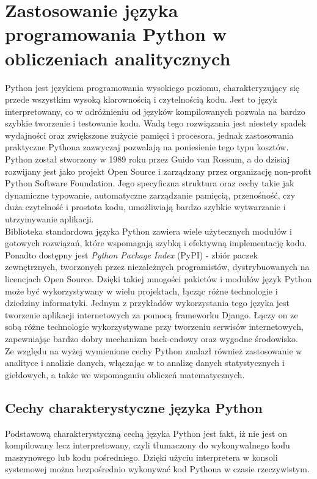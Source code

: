 
\chapter{Zastosowanie języka programowania Python w obliczeniach analitycznych}
Python jest językiem programowania wysokiego poziomu, charakteryzujący się przede wszystkim wysoką klarownością i czytelnością kodu.
Jest to język interpretowany, co w odróżnieniu od języków kompilowanych pozwala na bardzo szybkie tworzenie i testowanie kodu.
Wadą tego rozwiązania jest niestety spadek wydajności oraz zwiększone zużycie pamięci i procesora, jednak zastosowania praktyczne Pythona zazwyczaj pozwalają na poniesienie tego typu kosztów.\\

Python został stworzony w 1989 roku przez Guido van Rossum, a do dzisiaj rozwijany jest jako projekt Open Source i zarządzany przez organizację non-profit Python Software Foundation.
Jego specyficzna struktura oraz cechy takie jak dynamiczne typowanie, automatyczne zarządzanie pamięcią, przenośność, czy duża czytelność i prostota kodu, 
umożliwiają bardzo szybkie wytwarzanie i utrzymywanie aplikacji.\\

Biblioteka standardowa języka Python zawiera wiele użytecznych modułów i gotowych rozwiązań, które wspomagają szybką i efektywną implementację kodu.
Ponadto dostępny jest \textit{Python Package Index} (PyPI) - zbiór paczek zewnętrznych, tworzonych przez niezależnych programistów, dystrybuowanych na licencjach Open Source.
Dzięki takiej mnogości pakietów i modułów język Python może być wykorzystywany w wielu projektach, łącząc różne technologie i dziedziny informatyki.
Jednym z przykładów wykorzystania tego języka jest tworzenie aplikacji internetowych za pomocą frameworku Django.
Łączy on ze sobą różne technologie wykorzystywane przy tworzeniu serwisów internetowych, zapewniając bardzo dobry mechanizm back-endowy oraz wygodne środowisko.\\

Ze względu na wyżej wymienione cechy Python znalazł również zastosowanie w analityce i analizie danych, włączając w to analizę danych statystycznych i giełdowych, a także we wspomaganiu obliczeń matematycznych.


\section{Cechy charakterystyczne języka Python}
Podstawową charakterystyczną cechą języka Python jest fakt, iż nie jest on kompilowany lecz interpretowany, czyli tłumaczony do wykonywalnego kodu maszynowego lub kodu pośredniego.
Dzięki użyciu interpretera w konsoli systemowej można bezpośrednio wykonywać kod Pythona w czasie rzeczywistym.


